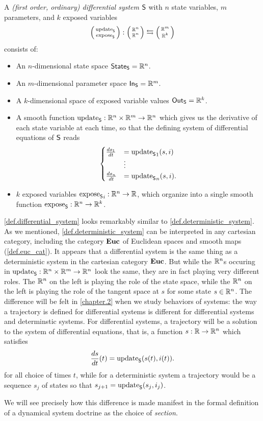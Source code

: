 \documentclass[DynamicalBook]{subfiles}
\begin{document}
\begin{definition}\label{def.differential_system}
  A \emph{(first order, ordinary) differential system} $\mathsf{S}$ with $n$ state variables, $m$
  parameters, and $k$ exposed variables 
\[
  \lens{\update{S}}{\expose{S}} : \lens{\rr^{n}}{\rr^n} \leftrightarrows \lens{\rr^m}{\rr^k}
\]
consists of:
\begin{itemize}
  \item An $n$-dimensional state space $\mathsf{State}_{\mathsf{S}} = \mathbb{R}^n$.
\item An $m$-dimensional parameter space $\mathsf{In}_{\mathsf{S}} = \mathbb{R}^m$.
\item A $k$-dimensional space of exposed variable values $\mathsf{Out}_{\mathsf{S}} = \mathbb{R}^k$.
\item A smooth function $\mathrm{update}_{\mathsf{S}} : \mathbb{R}^n \times \mathbb{R}^m \to \mathbb{R}^n$ which gives us the
  derivative of each state variable at each time, so that the defining
  system of differential equations of $\mathsf{S}$ reads
\[
\begin{cases}
\frac{ds_1}{dt} &= {\mathrm{update}_{\mathsf{S}}}_1(s,i) \\
&\vdots \\
\frac{ds_n}{dt} &= {\mathrm{update}_{\mathsf{S}}}_n(s, i).
\end{cases}
\]
\item $k$ exposed variables ${\mathrm{expose}_{\mathsf{S}}}_i : \mathbb{R}^n \to \mathbb{R}$, which organize into
  a single smooth function $\mathrm{expose}_{\mathsf{S}} : \mathbb{R}^n \to \mathbb{R}^k$.
\end{itemize}
\end{definition}


\begin{remark}
  \cref{def.differential_system} looks remarkably similar to
  \cref{def.deterministic_system}. As we mentioned,
  \cref{def.deterministic_system} can be interpreted in any cartesian category,
  including the category $\textbf{Euc}$ of Euclidean spaces and smooth maps
  (\cref{def.euc_cat}). It appears that a differential system is the same thing as a
  deterministic system in the cartesian category $\textbf{Euc}$. But while the
  $\mathbb{R}^n$s occuring in $\mathrm{update}_{\mathsf{S}} : \mathbb{R}^n \times \mathbb{R}^m \to \mathbb{R}^n$ look the
  same, they are in fact playing very different roles. The $\mathbb{R}^n$ on the left
  is playing the role of the state space, while the $\mathbb{R}^n$ on the left is
  playing the role of the tangent space at $s$ for some state $s \in \mathbb{R}^n$. The
  difference will be felt in \cref{chapter.2} when we study behaviors of
  systems: the way a trajectory is defined for differential systems is different
  for differential systems and determinstic systems. For differential systems, a
  trajectory will be a solution to the system of differential equations, that
  is, a function $s : \mathbb{R} \to \mathbb{R}^n$ which satisfies 
$$\frac{ds}{dt}(t) = \mathrm{update}_{\mathsf{S}}(s(t), i(t)).$$
for all choice of times $t$, while for a deterministic system a trajectory would
be a sequence $s_j$ of states so that $s_{j + 1} = \mathrm{update}_{\mathsf{S}}(s_j, i_j)$. 

 We will see precisely how
  this difference is made manifest in the formal definition of a dynamical
  system doctrine as the choice of \emph{section}.
\end{remark}
\end{document}
